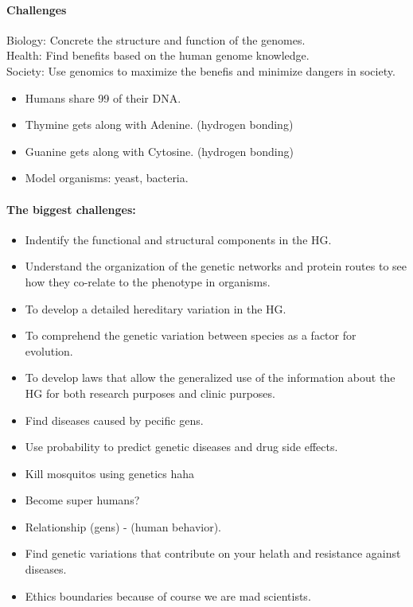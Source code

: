 \paragraph{Challenges}
Biology: Concrete the structure and function of the genomes. \\
Health: Find benefits based on the human genome knowledge. \\
Society: Use genomics to maximize the benefis and minimize dangers in society. \\


\begin{itemize}
    \item Humans share 99 of their DNA.
    \item Thymine gets along with Adenine. (hydrogen bonding)
    \item Guanine gets along with Cytosine. (hydrogen bonding)
    \item Model organisms: yeast, bacteria.
\end{itemize}

\paragraph{The biggest challenges: }

\begin{itemize}
    \item Indentify the functional and structural components in the HG.
    \item Understand the organization of the genetic networks and protein routes to see how
    they co-relate to the phenotype in organisms.
    \item To develop a detailed hereditary variation in the HG.
    \item To comprehend the genetic variation between species as a factor for evolution.
    \item To develop laws that allow the generalized use of the information
    about the HG for both research purposes and clinic purposes. 
    \item Find diseases caused by pecific gens.
    \item Use probability to predict genetic diseases and drug side effects.
    \item Kill mosquitos using genetics haha
    \item Become super humans? 
    \item Relationship (gens) - (human behavior).
    \item Find genetic variations that contribute on your helath and resistance against
    diseases.
    \item Ethics boundaries because of course we are mad scientists.
\end{itemize}


